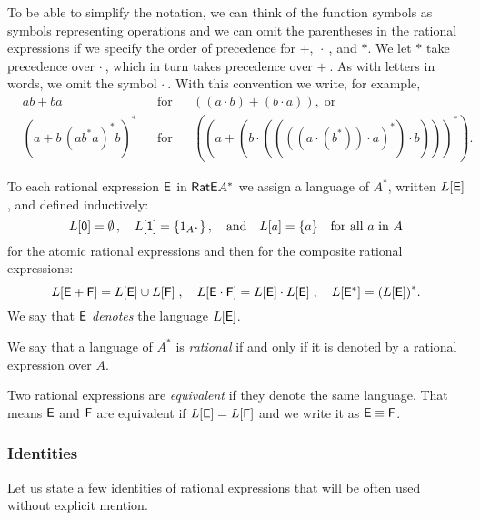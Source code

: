 To be able to simplify the notation, we can think of the function symbols as symbols representing operations and we can omit the parentheses in the rational expressions if we specify the order of precedence for $+, \: \cdot \:$, and $*$. We let $*$ take precedence over $\cdot \:$, which in turn takes precedence over $+ \:$. As with letters in words, we omit the symbol $\cdot \:$. With this convention we write, for example,
\begin{align*}
    &ab + ba & &\text{for} & &((a \cdot b) + (b \cdot a)), \; \text{or}\\
    &{(a + b \, {(a b^* a)}^* b)}^* & &\text{for} & &({(a + (b \cdot (({((a \cdot (b^*)) \cdot a)}^* ) \cdot b)))}^* ) .
\end{align*}

\begin{defn}
    To each rational expression ${\mathsf{E}}$ in ${\mathsf{RatE}} A^*$ we assign a language of $A^*$, written $L[{\mathsf{E}}]$, and defined inductively:
    \[
            L[{\mathsf{0}}] = \emptyset \, , \quad L[{\mathsf{1}}] = \{1_{A^*}\} \, , \quad \text{and} \quad L[a] = \{a\} \quad \text{for all $a$ in $A$}
    \]
    for the atomic rational expressions and then for the composite rational expressions:
    \[
        L[{\mathsf{E}} + {\mathsf{F}}] = L[{\mathsf{E}}] \cup L[{\mathsf{F}}] \; , \quad L[{\mathsf{E}} \cdot {\mathsf{F}}] = L[{\mathsf{E}}] \cdot L[{\mathsf{E}}] \; , \quad L[{\mathsf{E}}^*] = {(L[{\mathsf{E}}])}^*.
    \]
    We say that ${\mathsf{E}}$ \emph{denotes} the language $L[{\mathsf{E}}]$.
\end{defn}

We say that a language of $A^*$ is \emph{rational} if and only if it is denoted by a rational expression over $A$.

Two rational expressions are \emph{equivalent} if they denote the same language. That means ${\mathsf{E}}$ and ${\mathsf{F}}$ are equivalent if $L[{\mathsf{E}}] = L[{\mathsf{F}}]$ and we write it as ${\mathsf{E}} \equiv {\mathsf{F}}$.

\subsubsection*{Identities}

Let us state a few identities of rational expressions that will be often used without explicit mention.

